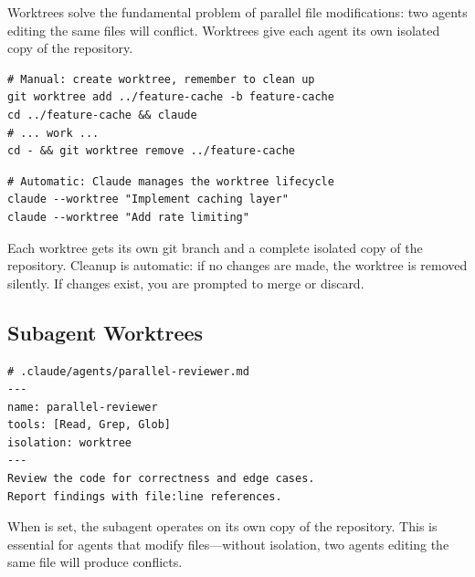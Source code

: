 
Worktrees solve the fundamental problem of parallel file modifications:
two agents editing the same files will conflict. Worktrees give each
agent its own isolated copy of the repository.

\begin{fullwidth}
\begin{beforeafter}
\before
\begin{verbatim}
# Manual: create worktree, remember to clean up
git worktree add ../feature-cache -b feature-cache
cd ../feature-cache && claude
# ... work ...
cd - && git worktree remove ../feature-cache
\end{verbatim}

\after
\begin{verbatim}
# Automatic: Claude manages the worktree lifecycle
claude --worktree "Implement caching layer"
claude --worktree "Add rate limiting"
\end{verbatim}
\end{beforeafter}
\end{fullwidth}

Each worktree gets its own git branch and a complete isolated copy of the
repository. Cleanup is automatic: if no changes are made, the worktree
is removed silently. If changes exist, you are prompted to merge or discard.

\subsection{Subagent Worktrees}


\begin{verbatim}
# .claude/agents/parallel-reviewer.md
---
name: parallel-reviewer
tools: [Read, Grep, Glob]
isolation: worktree
---
Review the code for correctness and edge cases.
Report findings with file:line references.
\end{verbatim}

When  is set, the subagent operates on
its own copy of the repository. This is essential for agents that
modify files---without isolation, two agents editing the same file
will produce conflicts.

